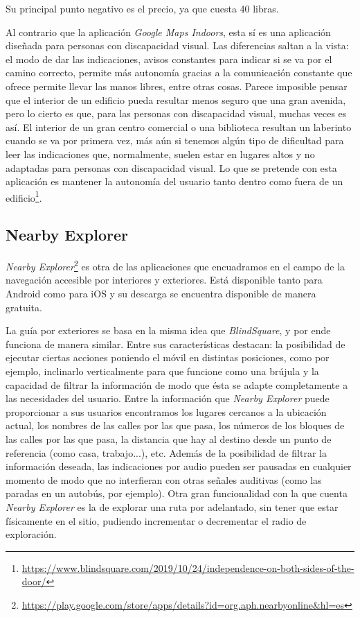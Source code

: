 Su principal punto negativo es el precio, ya que cuesta 40 libras.

Al contrario que la aplicación \textit{Google Maps Indoors}, esta sí es una aplicación diseñada para personas con discapacidad visual. Las diferencias saltan a la vista: el modo de dar las indicaciones, avisos constantes para indicar si se va por el camino correcto, permite más autonomía gracias a la comunicación constante que ofrece permite llevar las manos libres, entre otras cosas. Parece imposible pensar que el interior de un edificio pueda resultar menos seguro que una gran avenida, pero lo cierto es que, para las personas con discapacidad visual, muchas veces es así. El interior de un gran centro comercial o una biblioteca resultan un laberinto cuando se va por primera vez, más aún si tenemos algún tipo de dificultad para leer las indicaciones que, normalmente, suelen estar en lugares altos y no adaptadas para personas con discapacidad visual. Lo que se pretende con esta aplicación es mantener la autonomía del usuario tanto dentro como fuera de un edificio\footnote{\url{https://www.blindsquare.com/2019/10/24/independence-on-both-sides-of-the-door/}}.

\subsection{Nearby Explorer}
\textit{Nearby Explorer}\footnote{\url{https://play.google.com/store/apps/details?id=org.aph.nearbyonline&hl=es}} es otra de las aplicaciones que encuadramos en el campo de la navegación accesible por interiores y exteriores. Está disponible tanto para Android como para iOS y su descarga se encuentra disponible de manera gratuita. 

La guía por exteriores se basa en la misma idea que \textit{BlindSquare}, y por ende funciona de manera similar. Entre sus características destacan: la posibilidad de ejecutar ciertas acciones poniendo el móvil en distintas posiciones, como por ejemplo, inclinarlo verticalmente para que funcione como una brújula y la capacidad de filtrar la información de modo que ésta se adapte completamente a las necesidades del usuario. Entre la información que \textit{Nearby Explorer} puede proporcionar a sus usuarios encontramos los lugares cercanos a la ubicación actual, los nombres de las calles por las que pasa, los números de los bloques de las calles por las que pasa, la distancia que hay al destino desde un punto de referencia (como casa, trabajo...), etc. Además de la posibilidad de filtrar la información deseada, las indicaciones por audio pueden ser pausadas en cualquier momento de modo que no interfieran con otras señales auditivas (como las paradas en un autobús, por ejemplo). Otra gran funcionalidad con la que cuenta \textit{Nearby Explorer} es la de explorar una ruta por adelantado, sin tener que estar físicamente en el sitio, pudiendo incrementar o decrementar el radio de exploración.

